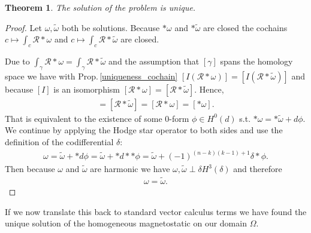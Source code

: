 \documentclass[12pt,a4paper]{article}
\newtheorem{theorem}{Theorem}
\theoremstyle{definition}
\newcommand{\rop}{\mathscr{R}} %
\begin{document}

\begin{theorem}
    The solution of the problem is unique.
\end{theorem}
\begin{proof}
    Let $\omega, \tilde{\omega}$ both be solutions. 
    Because  $*\omega$ and
    $*\tilde{\omega}$ are closed the cochains 
    $c\mapsto \int_c \rop*\omega$ and 
    $c\mapsto \int_c \rop*\tilde{\omega}$ are closed.
    
    Due to $\int_\gamma \rop *\omega = \int_\gamma \rop *\tilde{\omega}$ and the 
    assumption that $[\gamma]$ spans the homology space we have with 
    Prop.\,\ref{uniqueness_cochain} 
    $[I(\rop *\omega)] = [I(\rop *\tilde{\omega})]$
    and because $[I]$ is an isomorphism 
    $[\rop *\omega] = [\rop *\tilde{\omega}]$. Hence,
    \begin{align*}
    [*\tilde{\omega}] = [\rop *\tilde{\omega}] = 
    [\rop *\omega] = [*\omega].
    \end{align*}
    That is equivalent to the
    existence of some $0$-form $\phi \in H^0(d)$ s.t.
    $*\omega = *\tilde{\omega} + d\phi$. We continue by applying the Hodge
    star operator to both sides and use the definition of the codifferential 
    $\delta$:
    \begin{align*}
        \omega = \tilde{\omega} + *d\phi = \tilde{\omega} + *d**\phi 
        = \tilde{\omega} + (-1)^{(n-k)(k-1)+1}\delta * \phi.
    \end{align*}
    Then because $\omega$ and 
    $\tilde{\omega}$ are harmonic we have 
    $\omega, \tilde{\omega} \perp \delta H^{3}(\delta)$ and therefore 
    \begin{align*}
    \omega = \tilde{\omega}.    
    \end{align*}
\end{proof}
If we now translate this back to standard vector calculus terms we have found 
the unique solution of the homogeneous magnetostatic on our domain $\Omega$.
\end{document}
